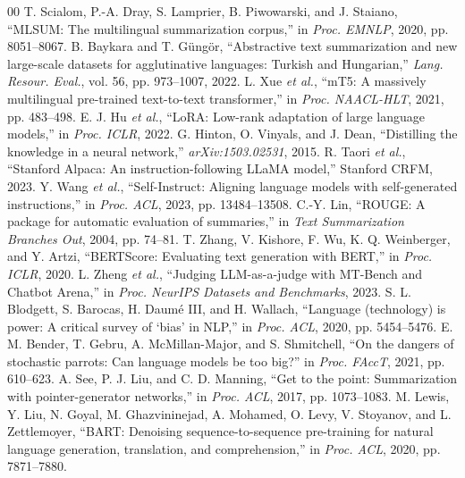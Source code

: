 \documentclass[conference]{IEEEtran}
\begin{document}
\footnotesize
\begin{thebibliography}{00}
 T. Scialom, P.-A. Dray, S. Lamprier, B. Piwowarski, and J. Staiano, ``MLSUM: The multilingual summarization corpus,'' in \emph{Proc. EMNLP}, 2020, pp. 8051--8067.
 B. Baykara and T. Güngör, ``Abstractive text summarization and new large-scale datasets for agglutinative languages: Turkish and Hungarian,'' \emph{Lang. Resour. Eval.}, vol. 56, pp. 973--1007, 2022.
 L. Xue \emph{et al.}, ``mT5: A massively multilingual pre-trained text-to-text transformer,'' in \emph{Proc. NAACL-HLT}, 2021, pp. 483--498.
 E. J. Hu \emph{et al.}, ``LoRA: Low-rank adaptation of large language models,'' in \emph{Proc. ICLR}, 2022.
 G. Hinton, O. Vinyals, and J. Dean, ``Distilling the knowledge in a neural network,'' \emph{arXiv:1503.02531}, 2015.
 R. Taori \emph{et al.}, ``Stanford Alpaca: An instruction-following LLaMA model,'' Stanford CRFM, 2023.
 Y. Wang \emph{et al.}, ``Self-Instruct: Aligning language models with self-generated instructions,'' in \emph{Proc. ACL}, 2023, pp. 13484--13508.
 C.-Y. Lin, ``ROUGE: A package for automatic evaluation of summaries,'' in \emph{Text Summarization Branches Out}, 2004, pp. 74--81.
 T. Zhang, V. Kishore, F. Wu, K. Q. Weinberger, and Y. Artzi, ``BERTScore: Evaluating text generation with BERT,'' in \emph{Proc. ICLR}, 2020.
 L. Zheng \emph{et al.}, ``Judging LLM-as-a-judge with MT-Bench and Chatbot Arena,'' in \emph{Proc. NeurIPS Datasets and Benchmarks}, 2023.
 S. L. Blodgett, S. Barocas, H. Daumé III, and H. Wallach, ``Language (technology) is power: A critical survey of `bias' in NLP,'' in \emph{Proc. ACL}, 2020, pp. 5454--5476.
 E. M. Bender, T. Gebru, A. McMillan-Major, and S. Shmitchell, ``On the dangers of stochastic parrots: Can language models be too big?'' in \emph{Proc. FAccT}, 2021, pp. 610--623.
 A. See, P. J. Liu, and C. D. Manning, ``Get to the point: Summarization with pointer-generator networks,'' in \emph{Proc. ACL}, 2017, pp. 1073--1083.
 M. Lewis, Y. Liu, N. Goyal, M. Ghazvininejad, A. Mohamed, O. Levy, V. Stoyanov, and L. Zettlemoyer, ``BART: Denoising sequence-to-sequence pre-training for natural language generation, translation, and comprehension,'' in \emph{Proc. ACL}, 2020, pp. 7871--7880.

\end{thebibliography}
\end{document}
